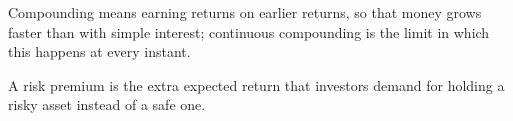 \begin{keyterms}
\small
\begin{description}[leftmargin=0pt, itemsep=2pt, parsep=0pt, font=\normalfont\bfseries\color{FEMaroon}]
  \item[Compounding.] Compounding means earning returns on earlier returns, so that money grows faster than with simple interest; continuous compounding is the limit in which this happens at every instant.
  \item[Risk premium.] A risk premium is the extra expected return that investors demand for holding a risky asset instead of a safe one.
\end{description}
\end{keyterms}
